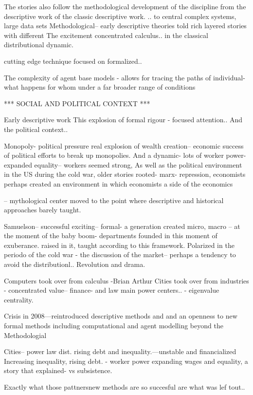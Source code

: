 The stories also follow the methodological development of the discipline from the descriptive work of the classic descriptive work. ..
to central complex systems, large data sets
Methodological-- early descriptive theories told rich layered stories with different
The excitement concentrated  calculus.. in the classical distributional dynamic.

cutting edge technique focused on formalized.. 


The complexity of agent base models - allows for tracing the paths of individual- what happens for whom under a far broader range of conditions



*** SOCIAL AND POLITICAL CONTEXT ***

Early descriptive work
This explosion of formal rigour - focused attention.. 
And the political context..


Monopoly- political pressure real explosion of wealth creation-- economic success of political efforts to break up monopolies.
And a dynamic- lots of worker power- expanded equality-- workers seemed strong, 
As well as the political environment in the US during the cold war, older stories rooted- marx- repression, economists perhaps created an environment in which economists
a side of the economics

-- mythological center moved to the point where descriptive and historical approaches barely taught.

Samuelson-- successful exciting-- formal-
a generation
created micro, macro
-- at the moment of the baby boom- departments founded in this moment of exuberance. raised in it, taught according to this framework.
Polarized in the periodo of the cold war - the discussion of the market-- perhaps a tendency to avoid the distributionl.. Revolution and drama.

Computers took over from calculus -Brian Arthur
Cities took over from industries - concentrated value-- finance- and law main power centers.. - eigenvalue centrality.

Crisis in 2008---reintroduced descriptive methods and and an openness to new formal methods including computational and agent modelling beyond the 
Methodologial

Cities-- power law dist. rising debt and inequality.---unstable and financialized
Increasing inequality, rising debt. - worker power expanding wages and equality, a story that explained- vs subsistence.


Exactly what those pattnersnew methods are so succesful are what was lef tout..

